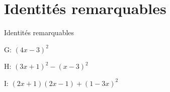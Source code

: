 \documentclass[usenames,dvipsnames,13pt,aspectratio=169]{beamer}
\begin{document}


\section{Identités remarquables}

\begin{frame}{Identités remarquables}


\begin{center}
 \huge{G: $  (4x-3)^2 $} \\
 \end{center}

\vspace{1cm}

\begin{center}
 \huge{H: $ (3x+1)^2 - (x-3)^2$} \\
\end{center}

\vspace{1cm}

\begin{center}
 \huge{I: $ (2x+1)(2x-1) + (1-3x)^2 $} \\
\end{center}



\end{frame}



\end{document}
